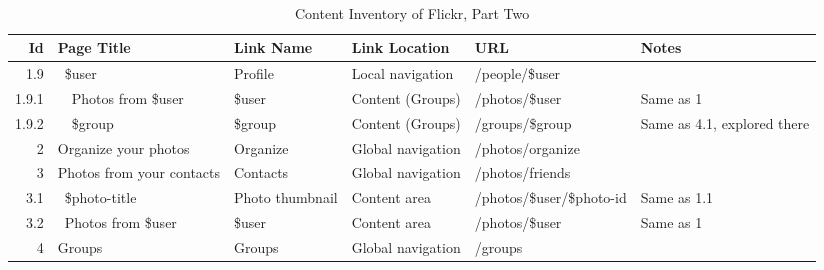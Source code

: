 \documentclass[12pt,a4paper]{article}
\begin{document}
\begin{landscape}
  \begin{table}[h!b!p!]
    \caption{Content Inventory of Flickr, Part Two}
    \label{table:flickr.content.inventory.2}
    \begin{center}
      \begin{tiny}
        \tt
        \begin{tabular}{r|l|l|l|l|p{3cm}}
            Id &
            Page Title &
            Link Name &
            Link Location &
            URL &
            Notes \\

            \hline

              1.9 &
              ~\$user &
              Profile &
              Local navigation &
              /people/\$user &
              \\

                1.9.1 &
                ~~Photos from \$user &
                \$user &
                Content (Groups) &
                /photos/\$user &
                Same as 1 \\

                1.9.2 &
                ~~\$group &
                \$group &
                Content (Groups) &
                /groups/\$group &
                Same as 4.1, explored there \\

            2 &
            Organize your photos &
            Organize &
            Global navigation &
            /photos/organize &
            \\

            3 &
            Photos from your contacts &
            Contacts &
            Global navigation &
            /photos/friends &
            \\

              3.1 &
              ~\$photo-title &
              Photo thumbnail &
              Content area &
              /photos/\$user/\$photo-id &
              Same as 1.1 \\

              3.2 &
              ~Photos from \$user &
              \$user &
              Content area &
              /photos/\$user &
              Same as 1 \\

            4 &
            Groups &
            Groups &
            Global navigation &
            /groups &
            \\


\end{tabular}
\end{tiny}
\end{center}
\end{table}
\end{landscape}
\end{document}
